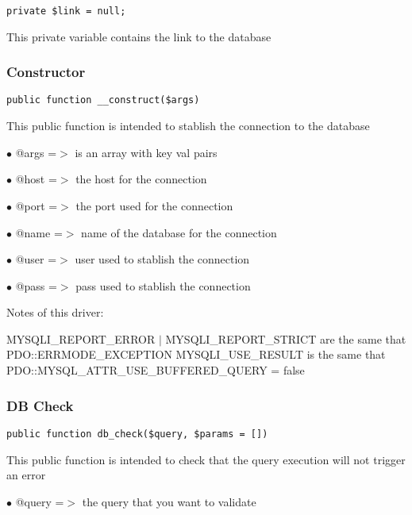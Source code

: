 \documentclass[a4paper]{article}
\begin{document}
\begin{lstlisting}
private $link = null;
\end{lstlisting}

This private variable contains the link to the database

\hypertarget{toc320}{}
\subsubsection{Constructor}

\begin{lstlisting}
public function __construct($args)
\end{lstlisting}

This public function is intended to stablish the connection to the database

\begin{compactitem}
\item[\color{myblue}$\bullet$] @args =$>$ is an array with key val pairs
\item[\color{myblue}$\bullet$] @host =$>$ the host for the connection
\item[\color{myblue}$\bullet$] @port =$>$ the port used for the connection
\item[\color{myblue}$\bullet$] @name =$>$ name of the database for the connection
\item[\color{myblue}$\bullet$] @user =$>$ user used to stablish the connection
\item[\color{myblue}$\bullet$] @pass =$>$ pass used to stablish the connection
\end{compactitem}

Notes of this driver:

MYSQLI\_REPORT\_ERROR $|$ MYSQLI\_REPORT\_STRICT are the same that PDO::ERRMODE\_EXCEPTION
MYSQLI\_USE\_RESULT is the same that PDO::MYSQL\_ATTR\_USE\_BUFFERED\_QUERY = false

\hypertarget{toc321}{}
\subsubsection{DB Check}

\begin{lstlisting}
public function db_check($query, $params = [])
\end{lstlisting}

This public function is intended to check that the query execution will not trigger an error

\begin{compactitem}
\item[\color{myblue}$\bullet$] @query =$>$ the query that you want to validate
\end{compactitem}
\end{document}
